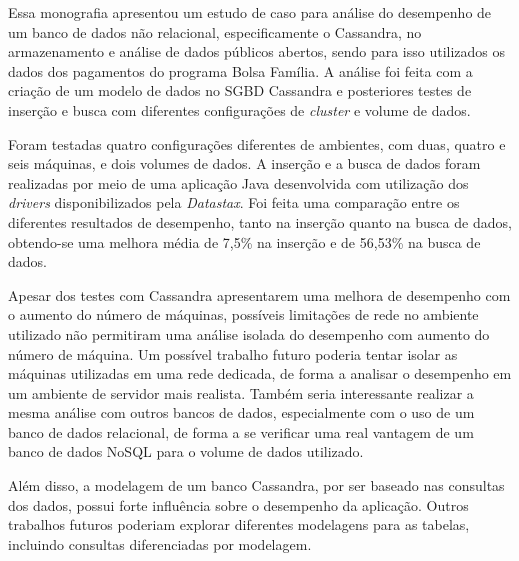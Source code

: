 Essa monografia apresentou um estudo de caso para análise do desempenho de um banco de dados não relacional, especificamente o Cassandra, no armazenamento e análise de dados públicos abertos, sendo para isso utilizados os dados dos pagamentos do programa Bolsa Família. A análise foi feita com a criação de um modelo de dados no SGBD Cassandra e posteriores testes de inserção e busca com diferentes configurações de \emph{cluster} e volume de dados.

Foram testadas quatro configurações diferentes de ambientes, com duas, quatro e seis máquinas, e dois volumes de dados. A inserção e a busca de dados foram realizadas por meio de uma aplicação Java desenvolvida com utilização dos \emph{drivers} disponibilizados pela \emph{Datastax}. Foi feita uma comparação entre os diferentes resultados de desempenho, tanto na inserção quanto na busca de dados, obtendo-se uma melhora média de 7,5\% na inserção e de 56,53\% na busca de dados.

Apesar dos testes com Cassandra apresentarem uma melhora de desempenho com o aumento do número de máquinas, possíveis limitações de rede no ambiente utilizado não permitiram uma análise isolada do desempenho com aumento do número de máquina. Um possível trabalho futuro poderia tentar isolar as máquinas utilizadas em uma rede dedicada, de forma a analisar o desempenho em um ambiente de servidor mais realista. Também seria interessante realizar a mesma análise com outros bancos de dados, especialmente com o uso de um banco de dados relacional, de forma a se verificar uma real vantagem de um banco de dados NoSQL para o volume de dados utilizado.

Além disso, a modelagem de um banco Cassandra, por ser baseado nas consultas dos dados, possui forte influência sobre o desempenho da aplicação. Outros trabalhos futuros poderiam explorar diferentes modelagens para as tabelas, incluindo consultas diferenciadas por modelagem.